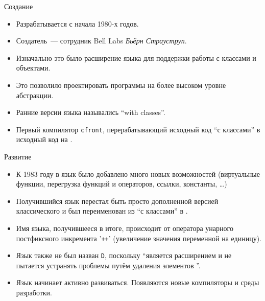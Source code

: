 \documentclass[aspectration=1610]{beamer}
\begin{document}
\begin{frame}{Создание \langcpp}
    \begin{itemize}
        \item Разрабатывается с начала 1980-х годов.
            
        \item Создатель~--- сотрудник Bell Labs {\em Бьёрн Страуструп}.
            
        \item Изначально это было расширение языка \langc для поддержки работы с 
            классами и объектами.
            
        \item Это позволило проектировать программы на более высоком уровне
            абстракции.
            
        \item Ранние версии языка назывались ``\langc with classes''.

        \item Первый компилятор \texttt{cfront}, перерабатывающий исходный код
            ``\langc с классами'' в исходный код на \langc. 
    \end{itemize}
\end{frame}

\begin{frame}{Развитие \langcpp}
    \begin{itemize}
        \item  К 1983 году в язык было добавлено много новых возможностей
            (виртуальные функции, перегрузка функций и операторов, ссылки, 
            константы, \dots)

        \item Получившийся язык перестал быть просто дополненной
            версией классического \langc и был переименован из ``\langc с классами'' в \langcpp. 
        
        \item Имя языка, получившееся в итоге, происходит от оператора 
            унарного постфиксного инкремента \langc{} '{\tt ++}' (увеличение значения переменной на единицу). 
            
        \item Язык также не был назван \texttt{D}, поскольку ``является расширением \langc
            и не пытается устранять проблемы путём удаления элементов \langc''.
        
        \item Язык начинает активно развиваться. Появляются новые компиляторы
             и среды разработки.
    \end{itemize}
\end{frame}
\end{document}
